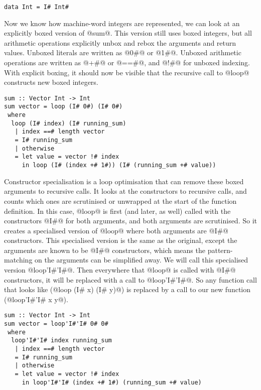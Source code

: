 \begin{lstlisting}
data Int = I# Int#
\end{lstlisting}

Now we know how machine-word integers are represented, we can look at an explicitly boxed version of @sum@.
This version still uses boxed integers, but all arithmetic operations explicitly unbox and rebox the arguments and return values.
Unboxed literals are written as @0#@ or @1#@.
Unboxed arithmetic operations are written as @+#@ or @==#@, and @!#@ for unboxed indexing.
With explicit boxing, it should now be visible that the recursive call to @loop@ constructs new boxed integers.

\begin{lstlisting}
sum :: Vector Int -> Int
sum vector = loop (I# 0#) (I# 0#)
 where
  loop (I# index) (I# running_sum)
   | index ==# length vector
   = I# running_sum
   | otherwise
   = let value = vector !# index
     in loop (I# (index +# 1#)) (I# (running_sum +# value))
\end{lstlisting}

Constructor specialisation \cite{peyton2007call} is a loop optimisation that can remove these boxed arguments to recursive calls.
It looks at the constructors to recursive calls, and counts which ones are scrutinised or unwrapped at the start of the function definition.
In this case, @loop@ is first (and later, as well) called with the constructors @I#@ for both arguments, and both arguments are scrutinised.
So it creates a specialised version of @loop@ where both arguments are @I#@ constructors.
This specialised version is the same as the original, except the arguments are known to be @I#@ constructors, which means the pattern-matching on the arguments can be simplified away.
We will call this specialised version @loop'I#'I#@.
Then everywhere that @loop@ is called with @I#@ constructors, it will be replaced with a call to @loop'I#'I#@.
So any function call that looks like (@loop (I# x) (I# y)@) is replaced by a call to our new function (@loop'I#'I# x y@).

\begin{lstlisting}
sum :: Vector Int -> Int
sum vector = loop'I#'I# 0# 0#
 where
  loop'I#'I# index running_sum
   | index ==# length vector
   = I# running_sum
   | otherwise
   = let value = vector !# index
     in loop'I#'I# (index +# 1#) (running_sum +# value)
\end{lstlisting}

